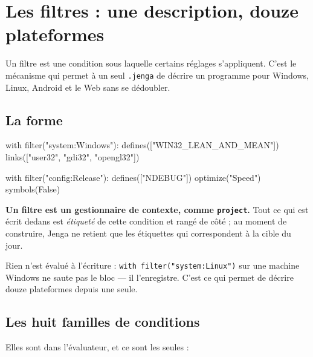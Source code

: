 \chapter{Les filtres : une description, douze plateformes}

Un filtre est une condition sous laquelle certains réglages s'appliquent. C'est
le mécanisme qui permet à un seul \texttt{.jenga} de décrire un programme pour
Windows, Linux, Android et le Web sans se dédoubler.

\section{La forme}

\begin{nkcode}{}
with filter("system:Windows"):
    defines(["WIN32_LEAN_AND_MEAN"])
    links(["user32", "gdi32", "opengl32"])

with filter("config:Release"):
    defines(["NDEBUG"])
    optimize("Speed")
    symbols(False)
\end{nkcode}

\begin{nkretenir}
\textbf{Un filtre est un gestionnaire de contexte, comme \texttt{project}.} Tout
ce qui est écrit dedans est \emph{étiqueté} de cette condition et rangé de côté ;
au moment de construire, Jenga ne retient que les étiquettes qui correspondent à
la cible du jour.

Rien n'est évalué à l'écriture : \texttt{with filter("system:Linux")} sur une
machine Windows ne saute pas le bloc --- il l'enregistre. C'est ce qui permet de
décrire douze plateformes depuis une seule.
\end{nkretenir}

\section{Les huit familles de conditions}

Elles sont dans l'évaluateur, et ce sont les seules :

